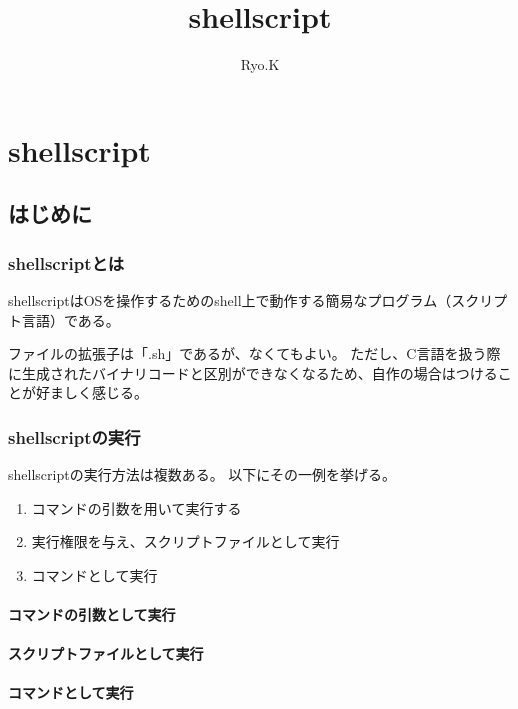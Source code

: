 \documentclass[a4paper, 12pt]{ltjsbook}
\begin{document}
\title{shellscript}
\author{Ryo.K}
\maketitle

\chapter{shellscript}
\section{はじめに}

\subsection{shellscriptとは}

shellscriptはOSを操作するためのshell上で動作する簡易なプログラム（スクリプト言語）である。

ファイルの拡張子は「.sh」であるが、なくてもよい。
ただし、C言語を扱う際に生成されたバイナリコードと区別ができなくなるため、自作の場合はつけることが好ましく感じる。

\subsection{shellscriptの実行}

shellscriptの実行方法は複数ある。
以下にその一例を挙げる。
\begin{enumerate}
    \item コマンドの引数を用いて実行する                %
    \item 実行権限を与え、スクリプトファイルとして実行      %
    \item コマンドとして実行                            %
\end{enumerate}

\subsubsection{コマンドの引数として実行}

\subsubsection{スクリプトファイルとして実行}

\subsubsection{コマンドとして実行}
\end{document}
